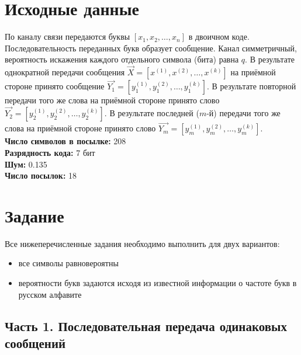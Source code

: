 






\tableofcontents
\newpage

\section{Исходные данные}

По каналу связи передаются буквы $[x_1, x_2,\dots, x_n]$ в двоичном коде. Последовательность переданных букв образует сообщение. Канал симметричный, вероятность искажения каждого отдельного символа (бита) равна $q$. В результате однократной передачи сообщения $\vec{X} = [x^{(1)}, x^{(2)},\dots, x^{(k)}]$ на приёмной стороне принято сообщение $\vec{Y_1} = [y_1^{(1)}, y_1^{(2)},\dots, y_1^{(k)}]$. В результате повторной передачи того же слова на приёмной стороне принято слово $\vec{Y_2} = [y_2^{(1)}, y_2^{(2)},\dots, y_2^{(k)}]$. В результате последней ($m$-й) передачи того же слова на приёмной стороне принято слово $\vec{Y_m} = [y_m^{(1)}, y_m^{(2)},\dots, y_m^{(k)}]$.\\[5mm]

\noindent \textbf{Число символов в посылке:} 208\\
\textbf{Разрядность кода:} 7 бит\\
\textbf{Шум:} 0.135\\
\textbf{Число посылок:} 18\\

\section{Задание}

Все нижеперечисленные задания необходимо выполнить для двух вариантов:

\begin{itemize}
	\item все символы равновероятны
	\item вероятности букв задаются исходя из известной информации о частоте букв в русском алфавите
\end{itemize}

\subsection{Часть 1. Последовательная передача одинаковых сообщений}

